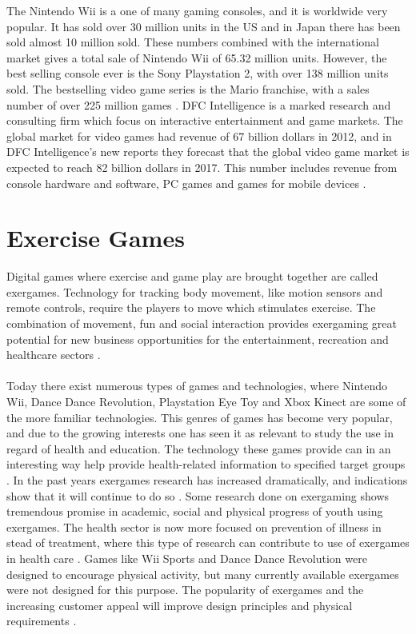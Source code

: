 The Nintendo Wii is a one of many gaming consoles, and it is worldwide very popular. It has sold over 30 million units in the US and in Japan there has been sold almost 10 million sold. These numbers combined with the international market gives a total sale of Nintendo Wii of 65.32 million units. However, the best selling console ever is the Sony Playstation 2, with over 138 million units sold. The bestselling video game series is the Mario franchise, with a sales number of over 225 million games \cite{statistics2012}. DFC Intelligence is a marked research and consulting firm which focus on interactive entertainment and game markets. The global market for video games had revenue of 67 billion dollars in 2012, and in DFC Intelligence’s new reports they forecast that the global video game market is expected to reach 82 billion dollars in 2017. This number includes revenue from console hardware and software, PC games and games for mobile devices \cite{videogameforcast} \cite{aboutdfcint}.

\section{Exercise Games}
Digital games where exercise and game play are brought together are called exergames. Technology for tracking body movement, like motion sensors and remote controls, require the players to move which stimulates exercise. The combination of movement, fun and social interaction provides exergaming great potential for new business opportunities for the entertainment, recreation and healthcare sectors \cite{gamingforhealth}. \\ \\
Today there exist numerous types of games and technologies, where Nintendo Wii, Dance Dance Revolution, Playstation Eye Toy and Xbox Kinect are some of the more familiar technologies. This genres of games has become very popular, and due to the growing interests one has seen it as relevant to study the use in regard of health and education. The technology these games provide can in an interesting way help provide health-related information to specified target groups \cite{gamingforhealth}. In the past years exergames research has increased dramatically, and indications show that it will continue to do so \cite{chamberlin2008exergames}. Some research done on exergaming shows tremendous promise in academic, social and physical progress of youth using exergames. The health sector is now more focused on prevention of illness in stead of treatment,  where this type of research can contribute to use of exergames in health care \cite{gamingforhealth}. Games like Wii Sports and Dance Dance Revolution were designed to encourage physical activity, but many currently available exergames were not designed for this purpose. The popularity of exergames and the increasing customer appeal will improve design principles and physical requirements \cite{chamberlin2008exergames}. 
